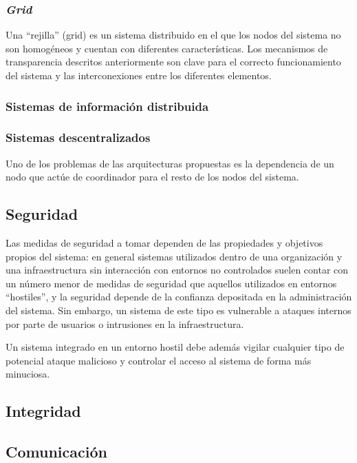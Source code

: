 \subsubsection{\textit{Grid}}

Una ``rejilla'' (grid) es un sistema distribuido en el que los nodos del sistema no son homogéneos y cuentan con diferentes características. Los mecanismos de transparencia descritos anteriormente son clave para el correcto funcionamiento del sistema y las interconexiones entre los diferentes elementos.

\subsubsection{Sistemas de información distribuida}

\subsubsection{Sistemas descentralizados}

Uno de los problemas de las arquitecturas propuestas es la dependencia de un nodo que actúe de coordinador para el resto de los nodos del sistema.

\subsection{Seguridad}

Las medidas de seguridad a tomar dependen de las propiedades y objetivos propios del sistema: en general sistemas utilizados dentro de una organización y una infraestructura sin interacción con entornos no controlados suelen contar con un número menor de medidas de seguridad que aquellos utilizados en entornos ``hostiles'', y la seguridad depende de la confianza depositada en la administración del sistema. Sin embargo, un sistema de este tipo es vulnerable a ataques internos por parte de usuarios o intrusiones en la infraestructura.

Un sistema integrado en un entorno hostil debe además vigilar cualquier tipo de potencial ataque malicioso y controlar el acceso al sistema de forma más minuciosa.

\subsection{Integridad}

\subsection{Comunicación}

